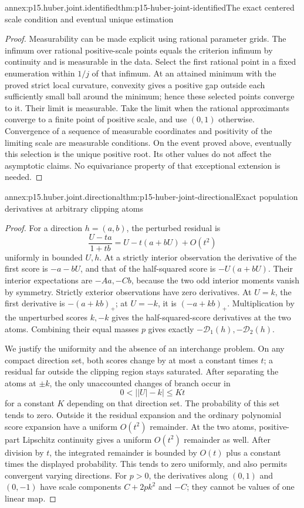 \begin{annexitem}{annex:p15.huber.joint.identified}{thm:p15-huber-joint-identified}{The exact centered scale condition and eventual unique estimation}
\begin{proof}
Measurability can be made explicit using rational parameter grids.
The infimum over rational positive-scale points equals the
criterion infimum by continuity and is measurable in the data.
Select the first rational point in a fixed enumeration within
\(1/j\) of that infimum. At an attained minimum with the proved
strict local curvature, convexity gives a positive gap outside
each sufficiently small ball around the minimum; hence these
selected points converge to it. Their limit is measurable.
Take the limit when the rational approximants converge to a finite
point of positive scale, and use \((0,1)\) otherwise.
Convergence of a sequence of measurable coordinates and positivity
of the limiting scale are measurable conditions.
On the event proved above, eventually this selection is the unique
positive root. Its other values do not affect the asymptotic claims.
No equivariance property of that exceptional extension is needed.
\end{proof}
\end{annexitem}

\begin{annexitem}{annex:p15.huber.joint.directional}{thm:p15-huber-joint-directional}{Exact population derivatives at arbitrary clipping atoms}
\begin{proof}
For a direction \(h=(a,b)\), the perturbed residual is
\[
 \frac{U-ta}{1+tb}=U-t(a+bU)+O(t^2)
\]
uniformly in bounded \(U,h\). At a strictly interior observation
the derivative of the first score is \(-a-bU\), and that of
the half-squared score is \(-U(a+bU)\).
Their interior expectations are \(-Aa,-Cb\), because the two
odd interior moments vanish by symmetry.
Strictly exterior observations have zero derivatives.
At \(U=k\), the first derivative is
\(-(a+kb)_+\); at \(U=-k\), it is \((-a+kb)_+\).
Multiplication by the unperturbed scores \(k,-k\) gives the
half-squared-score derivatives at the two atoms.
Combining their equal masses \(p\) gives exactly
\(-\mathcal D_1(h),-\mathcal D_2(h)\).

We justify the uniformity and the absence of an interchange problem.
On any compact direction set, both scores change by at most
a constant times \(t\); a residual far outside the clipping
region stays saturated. After separating the atoms at \(\pm k\),
the only unaccounted changes of branch occur in
\[
             0<\bigl||U|-k\bigr|\leq Kt
\]
for a constant \(K\) depending on that direction set.
The probability of this set tends to zero. Outside it the
residual expansion and the ordinary polynomial score expansion
have a uniform \(O(t^2)\) remainder.
At the two atoms, positive-part Lipschitz continuity gives
a uniform \(O(t^2)\) remainder as well.
After division by \(t\), the integrated remainder is bounded
by \(O(t)\) plus a constant times the displayed probability.
This tends to zero uniformly, and also permits convergent
varying directions. For \(p>0\), the derivatives along
\((0,1)\) and \((0,-1)\) have scale components
\(C+2pk^2\) and \(-C\); they cannot be values of one linear map.
\end{proof}
\end{annexitem}


